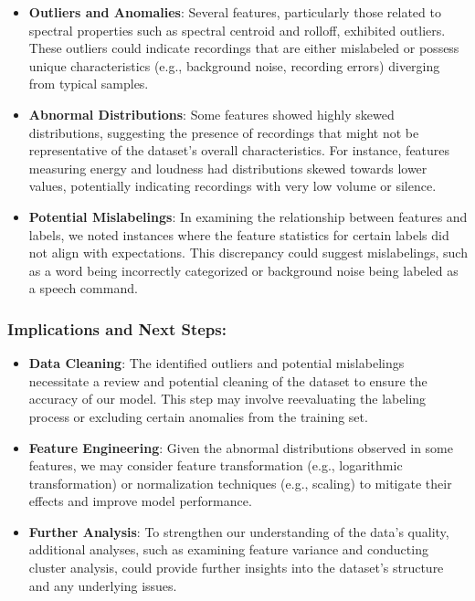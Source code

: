 \begin{itemize}
    \item \textbf{Outliers and Anomalies}: Several features, particularly those related to spectral properties such as spectral centroid and rolloff, exhibited outliers. These outliers could indicate recordings that are either mislabeled or possess unique characteristics (e.g., background noise, recording errors) diverging from typical samples.
    \item \textbf{Abnormal Distributions}: Some features showed highly skewed distributions, suggesting the presence of recordings that might not be representative of the dataset's overall characteristics. For instance, features measuring energy and loudness had distributions skewed towards lower values, potentially indicating recordings with very low volume or silence.
    \item \textbf{Potential Mislabelings}: In examining the relationship between features and labels, we noted instances where the feature statistics for certain labels did not align with expectations. This discrepancy could suggest mislabelings, such as a word being incorrectly categorized or background noise being labeled as a speech command.
\end{itemize}

\subsubsection{Implications and Next Steps:}

\begin{itemize}
    \item \textbf{Data Cleaning}: The identified outliers and potential mislabelings necessitate a review and potential cleaning of the dataset to ensure the accuracy of our model. This step may involve reevaluating the labeling process or excluding certain anomalies from the training set.
    \item \textbf{Feature Engineering}: Given the abnormal distributions observed in some features, we may consider feature transformation (e.g., logarithmic transformation) or normalization techniques (e.g., scaling) to mitigate their effects and improve model performance.
    \item \textbf{Further Analysis}: To strengthen our understanding of the data's quality, additional analyses, such as examining feature variance and conducting cluster analysis, could provide further insights into the dataset's structure and any underlying issues.
\end{itemize}

